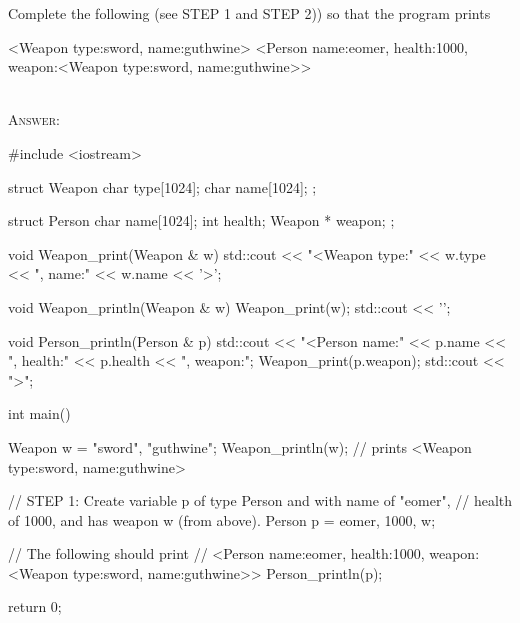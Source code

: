 \nextq
Complete the following (see STEP 1 and STEP 2))
so that the program prints
\begin{console}[fontsize=\footnotesize]
<Weapon type:sword, name:guthwine>
<Person name:eomer, health:1000, weapon:<Weapon type:sword, name:guthwine>>
\end{console}
\\
\textsc{Answer:}\vspace{-2mm}
\begin{answercode}
#include <iostream>

struct Weapon
{
    char type[1024];
    char name[1024];
};

struct Person
{
    char name[1024];
    int health;
    Weapon * weapon;
};

void Weapon_print(Weapon & w)
{
    std::cout << "<Weapon type:" << w.type << ", name:" << w.name << '>';
}

void Weapon_println(Weapon & w)
{
    Weapon_print(w);
    std::cout << '\n';
}

void Person_println(Person & p)
{
    std::cout << "<Person name:" << p.name
              << ", health:" << p.health
              << ", weapon:";
    Weapon_print(p.weapon);            
    std::cout << ">\n";
}

int main()
{
    Weapon w = {"sword", "guthwine"};
    Weapon_println(w); // prints <Weapon type:sword, name:guthwine>
    
    // STEP 1: Create variable p of type Person and with name of "eomer",
    // health of 1000, and has weapon w (from above).
    Person p = {eomer, 1000, w};

    // The following should print
    // <Person name:eomer, health:1000, weapon:<Weapon type:sword, name:guthwine>>
    Person_println(p);

    return 0;
}
\end{answercode}


\newpage


